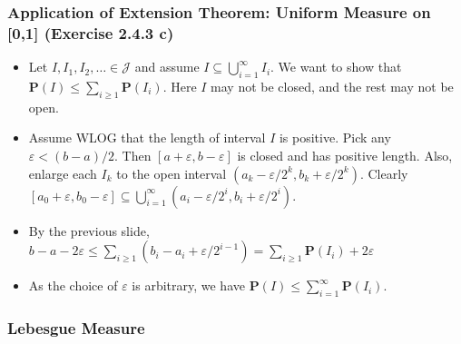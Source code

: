 \documentclass[handout]{beamer}
\newcommand{\BP}{\mathbf{P}}
\begin{document}
\frame
{
  \frametitle{Application of  Extension Theorem: Uniform Measure on [0,1] (Exercise 2.4.3 c)}

   \begin{itemize}


\item<1-> Let $I, I_1, I_2, \ldots \in \mathcal{J}$ and assume $I \subseteq \bigcup_{i=1}^{\infty}I_i$. We want to show that $\BP(I) \le \sum_{i\ge1}\BP(I_i)$. Here $I$ may not be closed, and the rest may not be open.

\item<2-> Assume WLOG that the length of interval $I$ is positive. Pick any $\varepsilon <(b-a)/2$. Then $[a+\varepsilon, b-\varepsilon]$ is closed and has positive length. Also, enlarge each $I_k$ to the open interval $(a_k-\varepsilon/2^k, b_k+\varepsilon/2^k)$. Clearly $[a_0+\varepsilon, b_0-\varepsilon] \subseteq \bigcup_{i=1}^{\infty} (a_i-\varepsilon/2^i, b_i+\varepsilon/2^i)$.

\item<3->[-] By the previous slide,  $b-a - 2\varepsilon \leq \sum_{i \ge 1} (b_i - a_i + \varepsilon/2^{i-1}) = \sum_{i\ge1}\BP(I_i) + 2\varepsilon $

\item<4->[-]  As the choice of $\varepsilon$ is arbitrary, we have  $\BP(I) \leq \sum_{i=1}^{\infty} \BP(I_i)$.


                   \end{itemize}
}

  \subsubsection{Lebesgue Measure}
\end{document}
